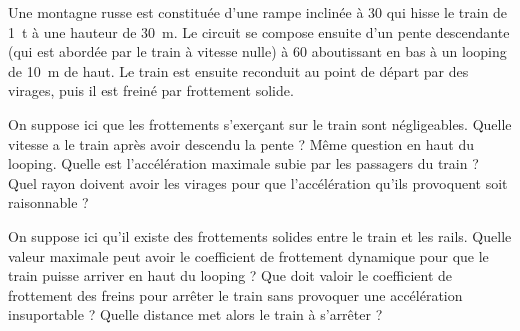 

Une montagne russe est constituée d'une rampe inclinée à \SI{30}{\deg} qui hisse le train de \SI{1}{t} à une hauteur de \SI{30}{m}. Le circuit se compose ensuite d'un pente descendante (qui est abordée par le train à vitesse nulle) à \SI{60}{\deg} aboutissant en bas à un looping de \SI{10}{m} de haut. Le train est ensuite reconduit au point de départ par des virages, puis il est freiné par frottement solide.

\question On suppose ici que les frottements s'exerçant sur le train sont négligeables.
\subquestion Quelle vitesse a le train après avoir descendu la pente ?
\subquestion Même question en haut du looping.
\subquestion Quelle est l'accélération maximale subie par les passagers du train ?
\subquestion Quel rayon doivent avoir les virages pour que l'accélération qu'ils provoquent soit raisonnable ?

\question On suppose ici qu'il existe des frottements solides entre le train et les rails.
\subquestion Quelle valeur maximale peut avoir le coefficient de frottement dynamique pour que le train puisse arriver en haut du looping ?
\subquestion Que doit valoir le coefficient de frottement des freins pour arrêter le train sans provoquer une accélération insuportable ?
\subquestion Quelle distance met alors le train à s'arrêter ?

